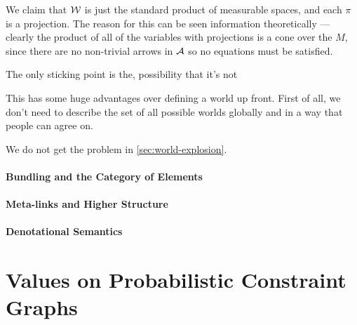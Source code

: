 \documentclass{article}
\begin{document}
\begin{vcat}
\begin{example}
		We claim that $\cal W$ is just the standard product of measurable spaces, and each $\pi$ is a projection. The reason for this can be seen information theoretically --- clearly the product of all of the variables with projections is a cone over the $M$, since there are no non-trivial arrows in $\cal A$ so no equations must be satisfied. %
		
		The only sticking point is the, possibility that it's not  %
	\end{example}

	This has some huge advantages over defining a world up front. First of all, we don't need to describe the set of all possible worlds globally and in a way that people can agree on. 
	
	We do not get the problem in \ref{sec:world-explosion}.
	
	
	\begin{example}
	\end{example}
	
	\begin{example}
		\todo{filtered limit}
	\end{example}

	\begin{conj}
	\end{conj}
	
	\subsection{Bundling and the Category of Elements}
	\subsection{Meta-links and Higher Structure}
	\subsection{Denotational Semantics}
\end{vcat}
	
	\part{Values on Probabilistic Constraint Graphs}
	
\end{document}
